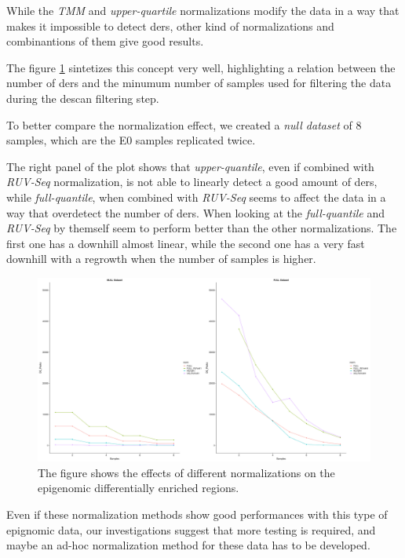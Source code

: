 While the \textit{TMM} and \textit{upper-quartile} normalizations modify the data in a way that makes it impossible to detect \glspl{der}, other kind of normalizations and combinantions of them give good results.

The figure \ref{fig:normalizationsnullfull} sintetizes this concept very well, highlighting a relation between the number of \glspl{der} and the minumum number of samples used for filtering the data during the \gls{descan} filtering step.

To better compare the normalization effect, we created a \textit{null dataset} of 8 samples, which are the E0 samples replicated twice.

The right panel of the plot shows that \textit{upper-quantile}, even if combined with \textit{RUV-Seq} normalization, is not able to linearly detect a good amount of \glspl{der}, while \textit{full-quantile}, when combined with \textit{RUV-Seq} seems to affect the data in a way that overdetect the number of \glspl{der}. 
When looking at the \textit{full-quantile} and \textit{RUV-Seq} by themself seem to perform better than the other normalizations. The first one has a downhill almost linear, while the second one has a very fast downhill with a regrowth when the number of samples is higher.

\begin{figure}[H]
\centering
\includegraphics[width=\textwidth, height=\textheight, keepaspectratio]{img/descan2/normalizations_null_full.png}
\caption[Normalizations applied to detected regions]{The figure shows the effects of different normalizations on the epigenomic differentially enriched regions.}
\label{fig:normalizationsnullfull}
\centering
\end{figure}

Even if these normalization methods show good performances with this type of epignomic data, our investigations suggest that more testing is required, and maybe an ad-hoc normalization method for these data has to be developed.

